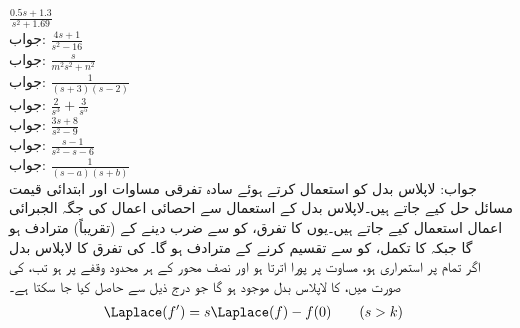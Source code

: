 \quad
$\frac{0.5s+1.3}{s^2+1.69}$\\
جواب:
\quad
$\frac{4s+1}{s^2-16}$\\
جواب:
\quad
$\frac{s}{m^2s^2+n^2}$\\
جواب:
\quad
$\frac{1}{(s+3)(s-2)}$\\
جواب:
\quad
$\frac{2}{s^3}+\frac{3}{s^5}$\\
جواب:
\quad
$\frac{3s+8}{s^2-9}$\\
جواب:
\quad
$\frac{s-1}{s^2-s-6}$\\
جواب:
\quad
$\frac{1}{(s-a)(s+b)}$\\
جواب:
لاپلاس بدل کو استعمال کرتے ہوئے سادہ تفرقی مساوات اور ابتدائی قیمت مسائل حل کیے جاتے ہیں۔لاپلاس بدل کے استعمال سے  احصائی اعمال کی جگہ الجبرائی اعمال استعمال کیے جاتے ہیں۔یوں  کا تفرق،  کو  سے ضرب دینے کے (تقریباً) مترادف ہو گا جبکہ  کا تکمل،   کو  سے تقسیم کرنے کے مترادف ہو گا۔ 
\quad {} کی تفرق کا لاپلاس بدل\\
اگر  تمام  پر استمراری ہو، مساوت  پر پورا اترتا ہو اور  نصف محور  کے ہر محدود وقفے پر  ہو تب،  کی صورت میں،  کا لاپلاس بدل موجود ہو گا جو درج ذیل سے حاصل کیا جا سکتا ہے۔
\begin{align} \label{مساوات_لاپلاس_درجہ_اول_تفرق}
\Laplace(f')&=s\Laplace(f)-f(0)\quad \quad (s>k)
\end{align}

